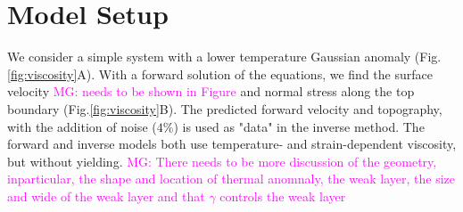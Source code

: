 \documentclass[12pt]{article}
\newcommand{\mgnote}[1]{\textcolor{magenta}{MG: #1}}
\begin{document}
\section*{Model Setup}
We consider a simple system with a lower temperature Gaussian anomaly (Fig.\ref{fig:viscosity}A). 
With a forward solution of the equations, we find the surface velocity \mgnote{needs to be shown in Figure} and normal stress along the top boundary (Fig.\ref{fig:viscosity}B). The predicted forward velocity and topography, with the addition of noise ($4 \%$) is used as "data" in the inverse method.
The forward and inverse models both use  temperature- and strain-dependent viscosity, but without yielding. 
\mgnote{There needs to be more discussion of the geometry, inparticular, the shape and location of thermal anomnaly, the weak layer, the size and wide of the weak layer and that $\gamma$ controls the weak layer}
\end{document}
